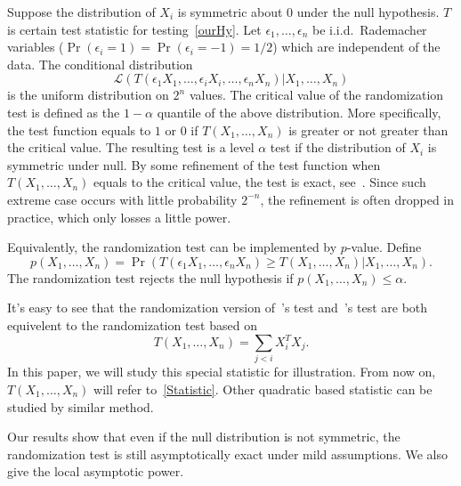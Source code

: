 \documentclass[review]{elsarticle}
\theoremstyle{plain}
\theoremstyle{definition}
\theoremstyle{remark}
\begin{document}
Suppose the distribution of $X_i$ is symmetric about $0$ under the null hypothesis. $T$ is certain test statistic for testing~\eqref{ourHy}.
Let $\epsilon_1,\ldots,\epsilon_n$ be i.i.d.\ Rademacher variables ($\Pr(\epsilon_i=1)=\Pr(\epsilon_i=-1)=1/2$) which are independent of the data.
The conditional distribution
\begin{equation}\label{ranDis}
    \mathcal{L}(T(\epsilon_1 X_1,\ldots,\epsilon_i X_i,\ldots,\epsilon_n X_n)|X_1,\ldots,X_n)
\end{equation}
is the uniform distribution on $2^n$ values.
The critical value of the randomization test is defined as the $1-\alpha$ quantile of the above distribution.
 More specifically, the test function equals to $1$ or $0$ if $T(X_1,\ldots, X_n)$ is greater or not greater than the critical value. The resulting test is a level $\alpha$ test if the distribution of $X_i$ is symmetric under null.
 By some refinement of the test function when $T(X_1,\ldots,X_n)$ equals to the critical value, the test is exact, see~\cite{Romano1990On}.
Since such extreme case occurs with little probability $2^{-n}$, the refinement is often dropped in practice, which only losses  a little power.

Equivalently, the randomization test can be implemented by $p$-value. Define 
\begin{equation}\label{firstPvalue}
    p(X_1,\ldots, X_n)=
    \Pr(T(\epsilon_1 X_1,\ldots,\epsilon_n X_n)\geq T( X_1,\ldots,X_n)|X_1,\ldots,X_n).
\end{equation}
The randomization test rejects the null hypothesis if $p(X_1,\ldots, X_n)\leq \alpha$. 




 It's easy to see that the randomization version of~\cite{Bai1996Efiect}'s test and~\cite{Chen2010A}'s test are both equivelent to the randomization test based on
\begin{equation}\label{Statistic}
    T(X_1,\ldots,X_n)=\sum_{j<i}X_i^T X_j.
\end{equation}
In this paper, we will study this special statistic for illustration.
From now on, $T(X_1,\ldots,X_n)$ will refer to~\eqref{Statistic}.
Other quadratic based statistic can be studied by similar method.

Our results show that even if the null distribution is not symmetric, the randomization test is still asymptotically exact under mild assumptions. 
We also give the local asymptotic power.



\end{document}
